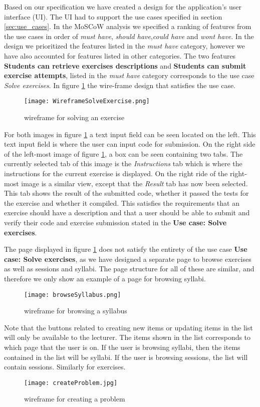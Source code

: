 
Based on our specification we have created a design for the application's user interface (UI). The UI had to support the use cases specified in section \ref*{sec:use_cases}. In the MoSCoW analysis we specified a ranking of features from the use cases in order of \textit{must have}, \textit{should have},\textit{could have} and \textit{wont have}. In the design we prioritized the features listed in the \textit{must have} category, however we have also accounted for features listed in other categories. The two features \textbf{Students can retrieve exercises descriptions} and \textbf{Students can submit exercise attempts}, listed in the \textit{must have} category corresponds to the use case \textit{Solve exercises}.
In figure \ref{fig:wfExercise} the wire-frame design that satisfies the use case.
\begin{figure}[H]
	\texttt{[image: WireframeSolveExercise.png]}
	\centering
	\caption{wireframe for solving an exercise}
	\label{fig:wfExercise}
\end{figure}

For both images in figure \ref{fig:wfExercise} a text input field can be seen located on the left. This text input field is where the user can input code for submission. On the right side of the left-most image of figure \ref{fig:wfExercise}, a box can be seen containing two tabs. The currently selected tab of this image is the \textit{Instructions} tab which is where the instructions for the current exercise is displayed. On the right ride of the right-most image is a similar view, except that the \textit{Result} tab has now been selected. This tab shows the result of the submitted code, whether it passed the tests for the exercise and whether it compiled. This satisfies the requirements that an exercise should have a description and that a user should be able to submit and verify their code and exercise submission stated in the \textbf{Use case: Solve exercises}.

The page displayed in figure \ref{fig:wfExercise} does not satisfy the entirety of the use case \textbf{Use case: Solve exercises}, as we have designed a separate page to browse exercises as well as sessions and syllabi. The page structure for all of these are similar, and therefore we only show an example of a page for browsing syllabi.
\begin{figure}[H]
    \texttt{[image: browseSyllabus.png]}
    \centering
    \caption{wireframe for browsing a syllabus}
    \label{fig:wfSyllabus}
\end{figure}
Note that the buttons related to creating new items or updating items in the list will only be available to the lecturer. The items shown in the list corresponds to which page that the user is on. If the user is browsing syllabi, then the items contained in the list will be syllabi. If the user is browsing sessions, the list will contain sessions. Similarly for exercises.
\begin{figure}[H]
	\texttt{[image: createProblem.jpg]}
	\centering
	\caption{wireframe for creating a problem}
	\label{fig:wfProblem}
\end{figure}


